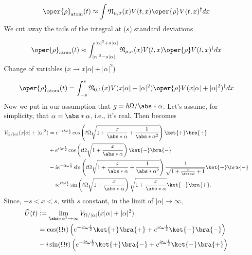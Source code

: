 \begin{equation}
    \oper{\rho}_{\text{atom}}(t)\approx \int \mathfrak{N}_{\mu, \sigma}(x) V(t, x) \oper{\rho} V(t, x)^{\dagger} dx
\end{equation}
We cut away the tails of the integral at (\( s \)) standard deviations

\begin{equation}
    \oper{\rho}_{\text{atom}}(t)\approx \int_{|\alpha|^2 - s|\alpha|}^{|\alpha|^2 + s|\alpha|}\mathfrak{N}_{\mu, \sigma}(x) V(t, x) \oper{\rho} V(t, x)^{\dagger} dx
\end{equation}
Change of variables (\( x \to x|\alpha| + |\alpha|^2 \))

\begin{equation}
    \label{eq:appen_JCM_rho_atom_t}
    \begin{aligned}
        \oper{\rho}_{\text{atom}}(t)= \int_{-s}^{s} \mathfrak{N}_{0, 1}(x) V(x|\alpha| + |\alpha|^2) 
    \oper{\rho} V(x|\alpha| + |\alpha|^2)^{\dagger} dx
    \end{aligned}
\end{equation}
Now we put in our assumption that \(g = \hbar\Omega / \abs*{\alpha}\). Let's assume, 
for simplicity, that \(\alpha = \abs*{\alpha}\), i.e., it's real. Then  becomes
\begin{align}
    V_{\Omega/|\alpha|}(x|\alpha| + |\alpha|^2) 
    &= e^{-i t \omega \frac{1}{2}}\cos \left( t\Omega \sqrt{1 + \frac{x}{\abs*{\alpha}}+ \frac{1}{\abs*{\alpha}^2}} \right) \ket{+}\bra{+} \nonumber \\
    &+ e^{i t \omega \frac{1}{2} }\cos \left( t\Omega \sqrt{1 + \frac{x}{\abs*{\alpha}}} \right) \ket{-}\bra{-} \nonumber \\
    &- i e^{-i t \omega \frac{1}{2} }\sin \left( t\Omega \sqrt{1 + \frac{x}{\abs*{\alpha}} + \frac{1}{\abs*{\alpha}^2}} \right) \frac{1}{\sqrt{1 + \frac{x}{\abs*{\alpha}} + 1}} \ket{+}\bra{-} \nonumber \\
    &- i e^{i t \omega \frac{1}{2}} \sin \left( t\Omega \sqrt{1 + \frac{x}{\abs*{\alpha}}} \right) \sqrt{1 + \frac{x}{\abs*{\alpha}}} \ket{-}\bra{+}. \nonumber
\end{align}
Since, \(-s < x < s\), with \(s\) constant, in the limit of \(|\alpha| \to \infty\),
\begin{align}
        \label{eq:appen_JCM_V_g_limit}
    \tilde{U}(t) &:= \lim_{\abs*{\alpha}^2 \to \infty} 
    V_{\Omega/|\alpha|}(x|\alpha| + |\alpha|^2)  \nonumber \\
    &= \cos(\Omega t) \left(e^{-i t \omega \frac{1}{2}}\ket{+}\bra{+} + 
    e^{i t \omega \frac{1}{2}}\ket{-}\bra{-} \right)  \nonumber \\
    &- i \sin(\Omega t)
     \left( e^{-i t \omega \frac{1}{2}}\ket{+}\bra{-}
    + e^{i t \omega \frac{1}{2}}\ket{-}\bra{+}\right)  \nonumber \\
\end{align}
